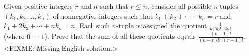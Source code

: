 \problem
Given positive integers $r$ and $n$ such that $r \leq n$, consider all possible $n$-tuples
$(k_1, k_2, \ldots, k_n)$ of nonnegative integers such that
$k_1 + k_2 + \cdots + k_n = r$ and $k_1 + 2 k_2 + \cdots + n k_n = n$.
Each such $n$-tuple is assigned the quotient
$\frac{1}{k_1! k_2! \cdots k_n!}$ (where $0! = 1$).
Prove that the sum of all these quotients equals
\(
   \frac{(n - 1)!}{(n - r)! r! (r - 1)!}
\).
\solution
<FIXME: Missing English solution.>
\endproblem
